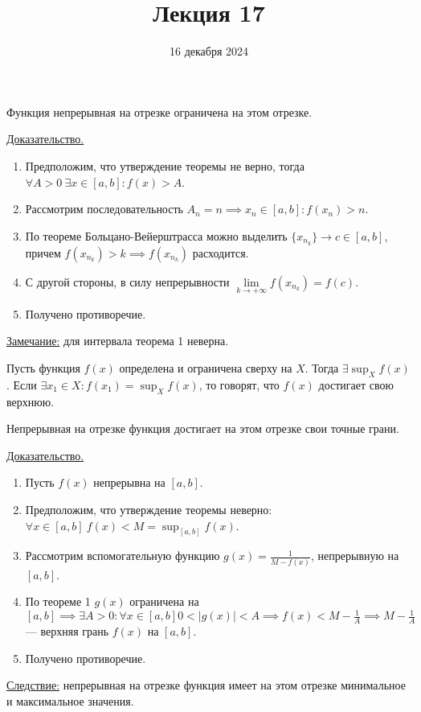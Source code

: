 \documentclass{article}
\title{Лекция 17}
\author{16 декабря 2024}
\date{}
\begin{document}
\maketitle

\begin{theorem}
    \noindent Функция непрерывная на отрезке ограничена на этом отрезке.
\end{theorem}
\noindent \underline{Доказательство.}
\begin{enumerate}
    \item Предположим, что утверждение теоремы не верно, тогда \(\forall A > 0\ \exists x \in {[a, b]}: f(x) > A\).
    \item Рассмотрим последовательность \(A_n = n \implies x_n \in {[a, b]}: f(x_n) > n\).
    \item По теореме Больцано-Вейерштрасса можно выделить \(\{x_{n_k}\} \to c \in {[a, b]}\), причем \(f(x_{n_k}) > k \implies f(x_{n_k})\) расходится.
    \item С другой стороны, в силу непрерывности \(\lim\limits_{k \to +\infty } f(x_{n_k}) = f(c)\).
    \item Получено противоречие.
\end{enumerate}
\noindent \underline{Замечание:} для интервала теорема 1 неверна.

\begin{claim}
    Пусть функция \(f(x)\) определена и ограничена сверху на \(X\).
    Тогда \(\displaystyle \exists \sup_{X}f(x)\).
    Если \(\displaystyle \exists x_1 \in X: f(x_1) = \sup_{X}f(x)\), то говорят, что \(f(x)\)
    достигает свою верхнюю.  
\end{claim}

\begin{theorem}
    Непрерывная на отрезке функция достигает на этом отрезке свои точные грани.
\end{theorem}
\noindent \underline{Доказательство.}
\begin{enumerate}
    \item Пусть \(f(x)\) непрерывна на \({[a, b]}\).
    \item Предположим, что утверждение теоремы неверно: \(\displaystyle \forall x \in {[a, b]}\ f(x) < M = \sup_{[a, b]}f(x)\).
    \item Рассмотрим вспомогательную функцию \(\displaystyle g(x) = \frac{1}{M - f(x)}\), непрерывную на \({[a, b]}\).
    \item По теореме 1 \(g(x)\) ограничена на \(\displaystyle {[a, b]} \implies \exists A > 0: \forall x \in {[a, b]} 0 < \left\vert g(x) \right\vert < A \implies f(x) < M - \frac{1}{A} \implies M - \frac{1}{A}\) --- верхняя грань \(f(x)\) на \({[a, b]}\).
    \item Получено противоречие.     
\end{enumerate}
\noindent \underline{Следствие:} непрерывная на отрезке функция имеет на этом отрезке минимальное и максимальное значения.
\end{document}
